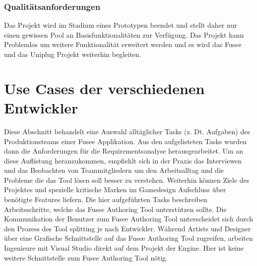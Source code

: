 \documentclass[pagesize, paper=a4, fontsize=12pt, titlepage=true, headings=small, headnosepline, abstractoff, liststotoc, nochapterprefix, plainheadsepline, twoside]{scrreprt}
\begin{document}
\subsubsection{Qualitätsanforderungen}
Das Projekt wird im Stadium eines Prototypen beendet und stellt daher nur einen gewissen Pool an Basisfunktionalitäten zur Verfügung. Das Projekt kann Problemlos um weitere Funktionalität erweitert werden und es wird das Fusee und das Uniplug Projekt weiterhin begleiten.

\section{Use Cases der verschiedenen Entwickler}
Diese Abschnitt behandelt eine Auswahl alltäglicher Tasks (z. Dt. Aufgaben) des Produktionsteams einer Fusee Applikation. Aus den aufgelisteten Tasks wurden dann die Anforderungen für die Requirementsanalyse herausgearbeitet. Um an diese Auflistung heranzukommen, empfiehlt sich in der Praxis das Interviewen und das Beobachten von Teammitgliedern um den Arbeitsalltag und die Probleme die das Tool lösen soll besser zu verstehen. Weiterhin können Ziele des Projektes und spezielle kritische Marken im Gamedesign Aufschluss über benötigte Features liefern.
Die hier aufgeführten Tasks beschreiben Arbeitsschritte, welche das Fusee Authoring Tool unterstützen sollte. Die Kommunikation der Benutzer zum Fusee Authoring Tool unterscheidet sich durch den Prozess des Tool splitting je nach Entwickler. Während Artists und Designer über eine Grafische Schnittstelle auf das Fusee Authoring Tool zugreifen, arbeiten Ingenieure mit Visual Studio direkt auf dem Projekt der Engine. Hier ist keine weitere Schnittstelle zum Fusee Authoring Tool nötig.
\end{document}
